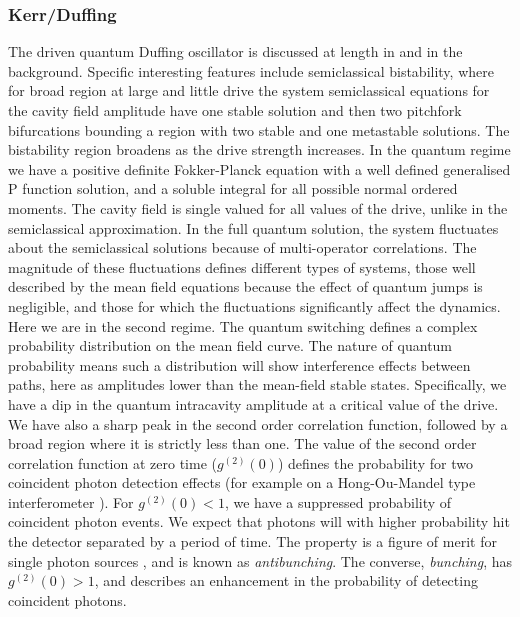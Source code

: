 \subsubsection{Kerr/Duffing}
The driven quantum Duffing oscillator is discussed at length in \cite{Drummond1979} and in the background. 
Specific interesting features include semiclassical bistability, where for broad region at large and little drive the system semiclassical equations for the cavity field amplitude have one stable solution and then two pitchfork bifurcations bounding a region with two stable and one metastable solutions.
The bistability region broadens as the drive strength increases.
In the quantum regime we have a positive definite Fokker-Planck equation with a well defined generalised P function solution, and a soluble integral for all possible normal ordered moments.
The cavity field is single valued for all values of the drive, unlike in the semiclassical approximation.
In the full quantum solution, the system fluctuates about the semiclassical solutions because of multi-operator correlations. 
The magnitude of these fluctuations defines different types of systems, those well described by the mean field equations because the effect of quantum jumps is negligible, and those for which the fluctuations significantly affect the dynamics. 
Here we are in the second regime.
The quantum switching defines a complex probability distribution on the mean field curve.
The nature of quantum probability means such a distribution will show interference effects between paths, here as amplitudes lower than the mean-field stable states.
Specifically, we have a dip in the quantum intracavity amplitude at a critical value of the drive. 
We have also a sharp peak in the second order correlation function, followed by a broad region where it is strictly less than one.
The value of the second order correlation function at zero time ($g^{(2)}(0)$) defines the probability for two coincident photon detection effects (for example on a Hong-Ou-Mandel type interferometer \cite{Hong1987}).
For $g^{(2)}(0) < 1$, we have a suppressed probability of coincident photon events. 
We expect that photons will with higher probability hit the detector separated by a period of time.
The property is a figure of merit for single photon sources \cite{Lodahl2014}, and is known as \emph{antibunching}.
The converse, \emph{bunching}, has $g^{(2)}(0) > 1$, and describes an enhancement in the probability of detecting coincident photons.
